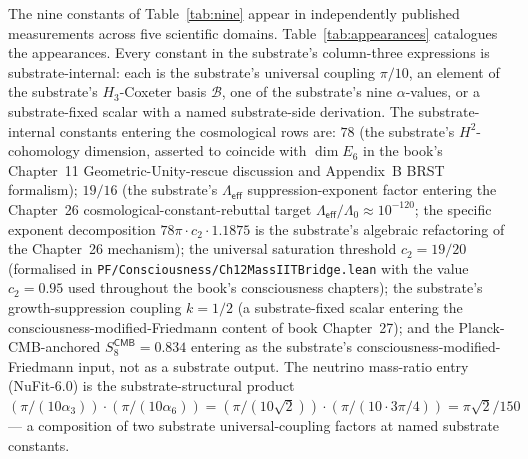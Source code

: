 \documentclass[11pt,a4paper]{amsart}
\theoremstyle{plain}
\theoremstyle{definition}
\begin{document}
The nine constants of Table~\ref{tab:nine} appear in independently published measurements across five scientific domains. Table~\ref{tab:appearances} catalogues the appearances. Every constant in the substrate's column-three expressions is substrate-internal: each is the substrate's universal coupling $\pi/10$, an element of the substrate's $H_3$-Coxeter basis $\mathcal{B}$, one of the substrate's nine $\alpha$-values, or a substrate-fixed scalar with a named substrate-side derivation. The substrate-internal constants entering the cosmological rows are: $78$ (the substrate's $H^2$-cohomology dimension, asserted to coincide with $\dim E_6$ in the book's Chapter~11 Geometric-Unity-rescue discussion and Appendix~B BRST formalism); $19/16$ (the substrate's $\Lambda_{\textsf{eff}}$ suppression-exponent factor entering the Chapter~26 cosmological-constant-rebuttal target $\Lambda_{\textsf{eff}}/\Lambda_0 \approx 10^{-120}$; the specific exponent decomposition $78\pi\cdot c_2\cdot 1.1875$ is the substrate's algebraic refactoring of the Chapter~26 mechanism); the universal saturation threshold $c_2 = 19/20$ (formalised in \texttt{PF/Consciousness/Ch12MassIITBridge.lean} with the value $c_2 = 0.95$ used throughout the book's consciousness chapters); the substrate's growth-suppression coupling $k = 1/2$ (a substrate-fixed scalar entering the consciousness-modified-Friedmann content of book Chapter~27); and the Planck-CMB-anchored $S_8^{\textsf{CMB}} = 0.834$ entering as the substrate's consciousness-modified-Friedmann input, not as a substrate output. The neutrino mass-ratio entry (NuFit-6.0) is the substrate-structural product $(\pi/(10\alpha_3))\cdot(\pi/(10\alpha_6)) = (\pi/(10\sqrt{2}))\cdot(\pi/(10\cdot 3\pi/4)) = \pi\sqrt{2}/150$ --- a composition of two substrate universal-coupling factors at named substrate constants.
\end{document}
